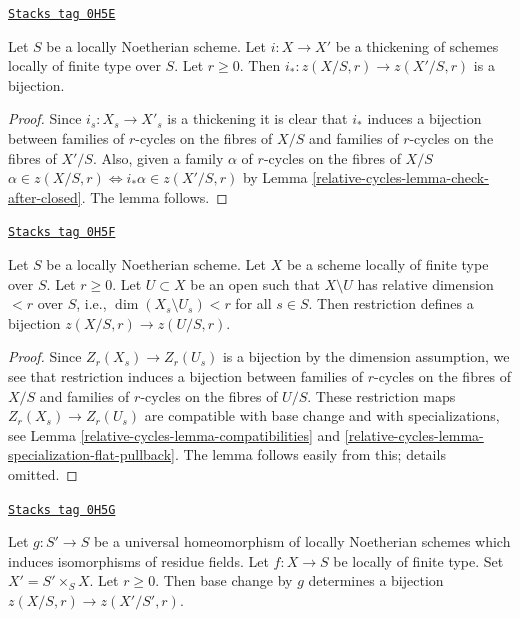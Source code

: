 \begin{lemma}[Thickening]
\label{relative-cycles-lemma-thickening}
\href{https://stacks.math.columbia.edu/tag/0H5E}{\texttt{Stacks tag 0H5E}}

Let $S$ be a locally Noetherian scheme. Let $i : X \to X'$ be a thickening
of schemes locally of finite type over $S$. Let $r \geq 0$.
Then $i_* : z(X/S, r) \to z(X'/S, r)$ is a bijection.
\end{lemma}

\begin{proof}
Since $i_s : X_s \to X'_s$ is a thickening it is clear that $i_*$ induces
a bijection between
families of $r$-cycles on the fibres of $X/S$ and
families of $r$-cycles on the fibres of $X'/S$.
Also, given a family $\alpha$ of $r$-cycles on the fibres of $X/S$
$\alpha \in z(X/S, r) \Leftrightarrow i_*\alpha \in z(X'/S, r)$
by Lemma \ref{relative-cycles-lemma-check-after-closed}. The lemma follows.
\end{proof}

\begin{lemma}
\label{relative-cycles-lemma-extend-to-larger}
\href{https://stacks.math.columbia.edu/tag/0H5F}{\texttt{Stacks tag 0H5F}}

Let $S$ be a locally Noetherian scheme. Let $X$ be a scheme locally
of finite type over $S$. Let $r \geq 0$. Let $U \subset X$ be an open
such that $X \setminus U$ has relative dimension $< r$ over $S$, i.e.,
$\dim(X_s \setminus U_s) < r$ for all $s \in S$. Then
restriction defines a bijection $z(X/S, r) \to z(U/S, r)$.
\end{lemma}

\begin{proof}
Since $Z_r(X_s) \to Z_r(U_s)$ is a bijection by the dimension assumption,
we see that restriction induces a bijection between
families of $r$-cycles on the fibres of $X/S$ and
families of $r$-cycles on the fibres of $U/S$.
These restriction maps $Z_r(X_s) \to Z_r(U_s)$ are
compatible with base change and with specializations, see
Lemma \ref{relative-cycles-lemma-compatibilities} and \ref{relative-cycles-lemma-specialization-flat-pullback}.
The lemma follows easily from this; details omitted.
\end{proof}

\begin{lemma}
\label{relative-cycles-lemma-seminormalize-base}
\href{https://stacks.math.columbia.edu/tag/0H5G}{\texttt{Stacks tag 0H5G}}

Let $g : S' \to S$ be a universal homeomorphism of locally Noetherian schemes
which induces isomorphisms of residue fields. Let $f : X \to S$ be locally of
finite type. Set $X' = S' \times_S X$. Let $r \geq 0$. Then base change by $g$
determines a bijection $z(X/S, r) \to z(X'/S', r)$.
\end{lemma}

